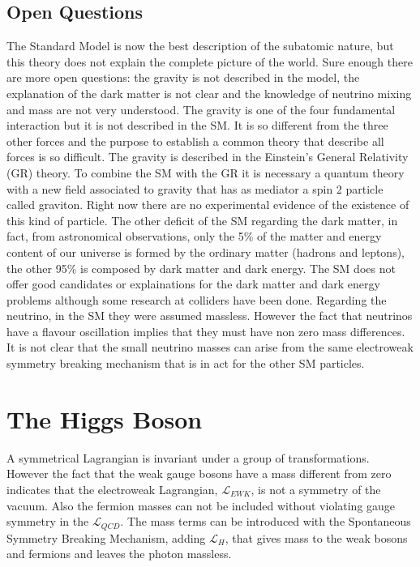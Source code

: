 \subsection*{Open Questions} The Standard Model is now the best description of the subatomic nature, but this theory does not explain the complete picture of the world. Sure enough there are more open questions: the gravity is not described in the model, the explanation of the dark matter is not clear and the knowledge of neutrino mixing and mass are not very understood.
The gravity is one of the four fundamental interaction but it is not described in the  SM. It is so different from the three other
forces and the purpose to establish a common theory that describe all forces is so difficult. The gravity is described in the  Einstein’s General Relativity (GR) theory. To combine the  SM with the GR it is necessary a quantum theory with a new field associated to gravity that has as mediator a spin 2 particle called graviton. Right now there are no experimental evidence of the existence of this kind of particle. The other deficit of the SM regarding the dark matter, in fact, from astronomical observations, only the 5\% of the  matter and energy content of our universe is formed by the ordinary matter (hadrons and leptons), the other 95\% is composed by dark matter and dark energy. The SM does not offer good candidates or explainations for the dark matter and dark energy problems although some research at colliders have been done.
Regarding the neutrino, in the SM they were assumed massless. However the fact that
neutrinos have a  flavour oscillation implies that they must have non zero mass differences.
It is not clear that the small neutrino masses  can arise from the same electroweak symmetry breaking mechanism that
is in act for the other SM particles.



\section{The Higgs Boson}
\label{H}
A symmetrical Lagrangian is invariant under a group of transformations. However the fact that the weak gauge bosons have a mass different from zero indicates that
the electroweak Lagrangian, $\mathcal{L}_{EWK}$, is not a symmetry of the vacuum. Also the fermion masses can
not be included without violating gauge symmetry in the $\mathcal{L}_{QCD}$.
The mass terms can be introduced with the Spontaneous Symmetry Breaking Mechanism, adding  $\mathcal{L}_{H}$, that gives mass to the weak bosons and fermions and leaves the photon massless. 

